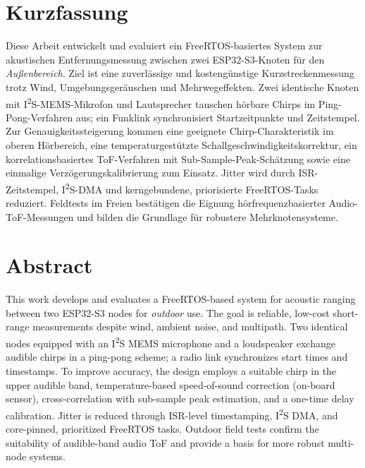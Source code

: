 \section*{Kurzfassung}

Diese Arbeit entwickelt und evaluiert ein FreeRTOS-basiertes System zur akustischen
Entfernungsmessung zwischen zwei ESP32-S3-Knoten für den \emph{Außenbereich}. Ziel ist
eine zuverlässige und kostengünstige Kurzstreckenmessung trotz Wind, Umgebungsgeräuschen
und Mehrwegeffekten. Zwei identische Knoten mit I\textsuperscript{2}S-MEMS-Mikrofon und
 Lautsprecher tauschen hörbare Chirps im Ping-Pong-Verfahren aus; ein Funklink synchronisiert
 Startzeitpunkte und Zeitstempel. Zur Genauigkeitssteigerung kommen eine geeignete
 Chirp-Charakteristik im oberen Hörbereich, eine temperaturgestützte
 Schallgeschwindigkeitskorrektur, ein korrelationsbasiertes ToF-Verfahren mit
 Sub-Sample-Peak-Schätzung sowie eine einmalige Verzögerungskalibrierung zum Einsatz.
 Jitter wird durch ISR-Zeitstempel, I\textsuperscript{2}S-DMA und kerngebundene,
  priorisierte FreeRTOS-Tasks reduziert. Feldtests im Freien bestätigen die Eignung
  hörfrequenzbasierter Audio-ToF-Messungen und bilden die Grundlage für robustere
  Mehrknotensysteme.

\section*{Abstract}

This work develops and evaluates a FreeRTOS-based system for acoustic ranging between
two ESP32-S3 nodes for \emph{outdoor} use. The goal is reliable, low-cost short-range
measurements despite wind, ambient noise, and multipath. Two identical nodes equipped
with an I\textsuperscript{2}S MEMS microphone and a loudspeaker exchange audible chirps
in a ping-pong scheme; a radio link synchronizes start times and timestamps. To improve accuracy,
 the design employs a suitable chirp in the upper audible band, temperature-based speed-of-sound
 correction (on-board sensor), cross-correlation with sub-sample peak estimation, and a one-time
 delay calibration. Jitter is reduced through ISR-level timestamping, I\textsuperscript{2}S DMA,
  and core-pinned, prioritized FreeRTOS tasks. Outdoor field tests confirm the suitability of
  audible-band audio ToF and provide a basis for more robust multi-node systems.
